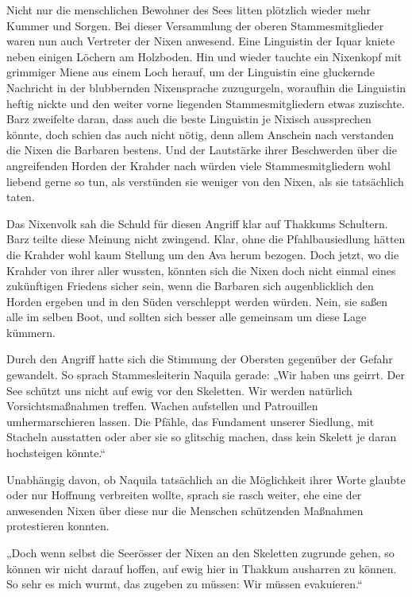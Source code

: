 Nicht nur die menschlichen Bewohner des Sees litten plötzlich wieder mehr Kummer und Sorgen. Bei dieser Versammlung der oberen Stammesmitglieder waren nun auch Vertreter der Nixen anwesend. Eine Linguistin der Iquar kniete neben einigen Löchern am Holzboden. Hin und wieder tauchte ein Nixenkopf mit grimmiger Miene aus einem Loch herauf, um der Linguistin eine gluckernde Nachricht in der blubbernden Nixensprache zuzugurgeln, woraufhin die Linguistin heftig nickte und den weiter vorne liegenden Stammesmitgliedern etwas zuzischte. Barz zweifelte daran, dass auch die beste Linguistin je Nixisch aussprechen könnte, doch schien das auch nicht nötig, denn allem Anschein nach verstanden die Nixen die Barbaren bestens. Und der Lautstärke ihrer Beschwerden über die angreifenden Horden der Krahder nach würden viele Stammesmitgliedern wohl liebend gerne so tun, als verstünden sie weniger von den Nixen, als sie tatsächlich taten.

Das Nixenvolk sah die Schuld für diesen Angriff klar auf Thakkums Schultern. Barz teilte diese Meinung nicht zwingend. Klar, ohne die Pfahlbausiedlung hätten die Krahder wohl kaum Stellung um den Ava herum bezogen. Doch jetzt, wo die Krahder von ihrer aller wussten, könnten sich die Nixen doch nicht einmal eines zukünftigen Friedens sicher sein, wenn die Barbaren sich augenblicklich den Horden ergeben und in den Süden verschleppt werden würden. Nein, sie saßen alle im selben Boot, und sollten sich besser alle gemeinsam um diese Lage kümmern.

Durch den Angriff hatte sich die Stimmung der Obersten gegenüber der Gefahr gewandelt. So sprach Stammesleiterin Naquila gerade: „Wir haben uns geirrt. Der See schützt uns nicht auf ewig vor den Skeletten. Wir werden natürlich Vorsichtsmaßnahmen treffen. Wachen aufstellen und Patrouillen umhermarschieren lassen. Die Pfähle, das Fundament unserer Siedlung, mit Stacheln ausstatten oder aber sie so glitschig machen, dass kein Skelett je daran hochsteigen könnte.“

Unabhängig davon, ob Naquila tatsächlich an die Möglichkeit ihrer Worte glaubte oder nur Hoffnung verbreiten wollte, sprach sie rasch weiter, ehe eine der anwesenden Nixen über diese nur die Menschen schützenden Maßnahmen protestieren konnten.

„Doch wenn selbst die Seerösser der Nixen an den Skeletten zugrunde gehen, so können wir nicht darauf hoffen, auf ewig hier in Thakkum ausharren zu können. So sehr es mich wurmt, das zugeben zu müssen: Wir müssen evakuieren.“


